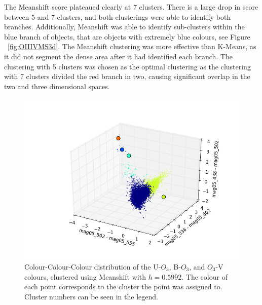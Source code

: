 The Meanshift score plateaued clearly at 7 clusters. There is a large drop in score between 5 and 7 clusters, and both clusterings were able to identify both branches.
Additionally, Meanshift was able to identify sub-clusters within the blue branch of objects, that are objects with extremely blue colours, see Figure ~\ref{fig:OIIIVMS3d}.
The Meanshift clustering was more effective than K-Means, as it did not segment the dense area after it had identified each branch.
The clustering with 5 clusters was chosen as the optimal clustering as the clustering with 7 clusters divided the red branch in two, causing significant overlap in the two and three dimensional spaces.

\begin{figure}
\centering
\includegraphics[width=\linewidth]{figs/meanshift_3d_color_5cl_mag05_502-mag05_555vsmag05_336-mag05_502vsmag05_438-mag05_502}
\caption{Colour-Colour-Colour distribution of the U-$O_{3}$, B-$O_{3}$, and $O_{3}$-V colours, clustered using Meanshift with $h=0.5992$. The colour of each point corresponds to the cluster the point was assigned to. Cluster numbers can be seen in the legend.}
\label{fig:fig:OIIIVMS3d}
\end{figure}

